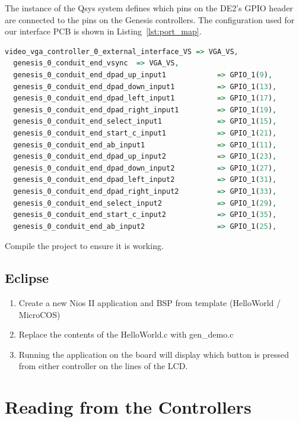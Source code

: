 \documentclass{capstonedoc}
\begin{document}
The instance of the Qsys system defines which pins on the DE2's GPIO header are
connected to the pins on the Genesis controllers. The configuration used for our
interface PCB is shown in Listing~\ref{lst:port_map}.

\begin{lstlisting}[language={vhdl},caption={Port Map Configuration},label={lst:port_map}]
  video_vga_controller_0_external_interface_VS => VGA_VS,
  genesis_0_conduit_end_vsync  => VGA_VS,
  genesis_0_conduit_end_dpad_up_input1            => GPIO_1(9),
  genesis_0_conduit_end_dpad_down_input1          => GPIO_1(13),
  genesis_0_conduit_end_dpad_left_input1          => GPIO_1(17),
  genesis_0_conduit_end_dpad_right_input1         => GPIO_1(19),
  genesis_0_conduit_end_select_input1             => GPIO_1(15),
  genesis_0_conduit_end_start_c_input1            => GPIO_1(21),
  genesis_0_conduit_end_ab_input1                 => GPIO_1(11),
  genesis_0_conduit_end_dpad_up_input2            => GPIO_1(23),
  genesis_0_conduit_end_dpad_down_input2          => GPIO_1(27),
  genesis_0_conduit_end_dpad_left_input2          => GPIO_1(31),
  genesis_0_conduit_end_dpad_right_input2         => GPIO_1(33),
  genesis_0_conduit_end_select_input2             => GPIO_1(29),
  genesis_0_conduit_end_start_c_input2            => GPIO_1(35),
  genesis_0_conduit_end_ab_input2                 => GPIO_1(25),
\end{lstlisting}

Compile the project to ensure it is working. 

\subsection{Eclipse}

\begin{enumerate}
  \item Create a new Nios II application and BSP from template (HelloWorld / MicroCOS)
  \item Replace the contents of the HelloWorld.c with gen\_demo.c
  \item Running the application on the board will display which button 
is pressed from either controller on the lines of the LCD.
\end{enumerate}

\section{Reading from the Controllers}
\end{document}
